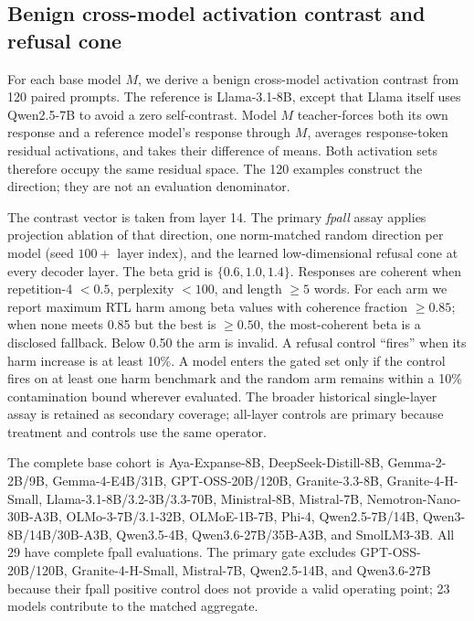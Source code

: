 \documentclass[letterpaper]{article}
\begin{document}
\subsection{Benign cross-model activation contrast and refusal cone}

For each base model $M$, we derive a benign cross-model activation contrast from 120
paired prompts. The reference is Llama-3.1-8B, except that Llama itself uses
Qwen2.5-7B to avoid a zero self-contrast. Model $M$ teacher-forces both its own response and a reference model's
response through $M$, averages response-token residual activations, and takes their
difference of means. Both activation sets therefore occupy the same residual space.
The 120 examples construct the direction; they are not an evaluation denominator.

The contrast vector is taken from layer 14. The primary \emph{fpall} assay applies
projection ablation of that direction, one norm-matched random direction per model
(seed $100+$ layer index), and the learned
low-dimensional refusal cone at every decoder layer. The beta grid is
$\{0.6,1.0,1.4\}$. Responses are coherent when repetition-4 $<0.5$, perplexity $<100$,
and length $\ge5$ words. For each arm we report maximum RTL harm among beta values with
coherence fraction $\ge0.85$; when none meets 0.85 but the best is $\ge0.50$, the
most-coherent beta is a disclosed fallback. Below 0.50 the arm is invalid. A refusal
control ``fires'' when its harm increase is at least 10\%. A model enters the gated
set only if the control fires on at least one harm benchmark and the random arm remains
within a 10\% contamination bound wherever evaluated. The broader historical
single-layer assay is retained as secondary coverage; all-layer controls are
primary because treatment and controls use the same operator.

The complete base cohort is Aya-Expanse-8B, DeepSeek-Distill-8B, Gemma-2-2B/9B,
Gemma-4-E4B/31B, GPT-OSS-20B/120B, Granite-3.3-8B, Granite-4-H-Small,
Llama-3.1-8B/3.2-3B/3.3-70B, Ministral-8B, Mistral-7B,
Nemotron-Nano-30B-A3B, OLMo-3-7B/3.1-32B, OLMoE-1B-7B, Phi-4,
Qwen2.5-7B/14B, Qwen3-8B/14B/30B-A3B, Qwen3.5-4B,
Qwen3.6-27B/35B-A3B, and SmolLM3-3B. All 29 have complete fpall evaluations. The
primary gate excludes GPT-OSS-20B/120B, Granite-4-H-Small, Mistral-7B, Qwen2.5-14B,
and Qwen3.6-27B because their fpall positive control does not provide a valid operating
point; 23 models contribute to the matched aggregate.
\end{document}
